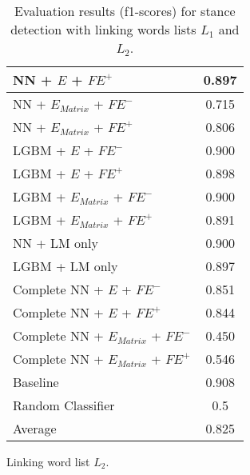 \begin{table}[h]
\begin{subtable}{.5\textwidth}
\begin{tabular}{|| l || c ||}
 			\hline
 			NN + $E$ + $\textit{FE}^+$ & 0.897 \\
 			\hline
 			NN + $E_{Matrix}$ + $\textit{FE}^-$ & 0.715 \\
 			\hline
 			NN + $E_{Matrix}$ + $\textit{FE}^+$ & 0.806 \\
 			\hline
 			LGBM + $E$ + $\textit{FE}^-$ & 0.900 \\
 			\hline
 			LGBM + $E$ + $\textit{FE}^+$ & 0.898 \\
 			\hline
 			LGBM + $E_{Matrix}$ + $\textit{FE}^-$ & 0.900 \\
 			\hline
 			LGBM + $E_{Matrix}$ + $\textit{FE}^+$ & 0.891 \\
 			\hline
 			NN + LM only & 0.900 \\
 			\hline
 			LGBM + LM only & 0.897 \\
 			\hline
 			Complete NN + $E$ + $\textit{FE}^-$ & 0.851 \\
 			\hline
 			Complete NN + $E$ + $\textit{FE}^+$ & 0.844 \\
 			\hline
 			Complete NN + $E_{Matrix}$ + $\textit{FE}^-$ & 0.450 \\
 			\hline
 			Complete NN + $E_{Matrix}$ + $\textit{FE}^+$ & 0.546 \\
 			\hline
 			Baseline & 0.908 \\
 			\hline
 			Random Classifier & 0.5 \\
 			\hline
 			\hline
 			Average & 0.825 \\
 			\hline
		\end{tabular}
		\renewcommand{\arraystretch}{1}
  		\caption{Linking word list $L_2$.}%
  	\end{subtable}
  	\caption{Evaluation results (f1-scores) for stance detection with linking words lists $L_1$ and $L_2$.}%
  	\label{fig:stanceresults}
\end{table}

